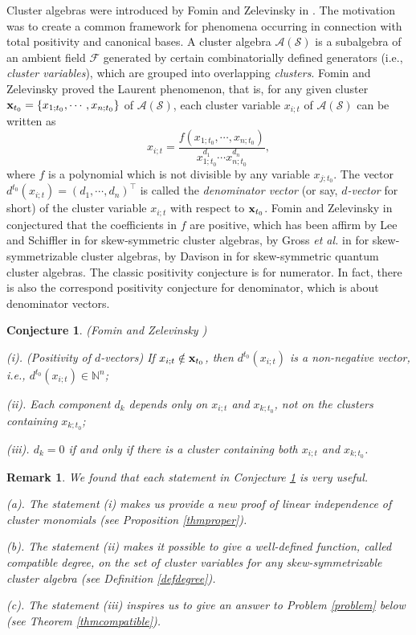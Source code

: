 \documentclass[14pt]{amsart}
\newtheorem{Remark}[Theorem]{Remark}
\newtheorem{Conjecture}[Theorem]{Conjecture}
\begin{document}
Cluster algebras were introduced by Fomin and Zelevinsky in \cite{FZ}. The motivation was to create a common framework for phenomena occurring in connection
with total positivity and canonical bases. A cluster algebra $\mathcal A(\mathcal S)$  is a subalgebra of an ambient field $\mathcal F$ generated by certain combinatorially defined generators (i.e., {\em cluster variables}), which are grouped into overlapping {\em clusters}.  Fomin and  Zelevinsky proved the Laurent phenomenon, that is,  for any given cluster ${\bf x}_{t_0}=\{x_{1;t_0},\cdots,x_{n;t_0}\}$ of $\mathcal A(\mathcal S)$, each cluster variable $x_{i;t}$ of $\mathcal A(\mathcal S)$ can be written as
 $$x_{i;t}=\frac{f(x_{1;t_0},\cdots,x_{n;t_0})}{x_{1;t_0}^{d_1}\cdots x_{n;t_0}^{d_n}},$$
where $f$ is a polynomial which is not divisible by any variable $x_{j;t_0}$. The vector $d^{t_0}(x_{i;t})=(d_1,\cdots,d_n)^{\top}$ is called  the {\em denominator vector} (or say, {\em $d$-vector} for short) of the cluster variable $x_{i;t}$ with respect to ${\bf x}_{t_0}$.  Fomin and Zelevinsky in \cite{FZ} conjectured that the coefficients in $f$ are positive, which has been affirm by Lee and Schiffler in \cite{LS} for skew-symmetric cluster algebras, by Gross {\em et al.} in \cite{GHKK} for skew-symmetrizable cluster algebras, by Davison in \cite{D} for skew-symmetric quantum cluster algebras. The classic positivity conjecture is for numerator. In fact, there is also the correspond positivity conjecture for denominator, which is about denominator vectors.




\begin{Conjecture}(Fomin and Zelevinsky \cite[Conjecture 7.4]{FZ3})\label{conjecture}


(i). (Positivity of $d$-vectors) If $x_{i;t}\notin {\bf x}_{t_0}$, then $d^{t_0}(x_{i;t})$ is a non-negative vector, i.e., $d^{t_0}(x_{i;t})\in\mathbb N^n$;

(ii). Each component $d_k$ depends only on $x_{i;t}$ and $x_{k;t_0}$, not on the clusters containing $x_{k;t_0}$;

(iii). $d_k=0$ if and only if there is a cluster containing both $x_{i;t}$ and $x_{k;t_0}$.
\end{Conjecture}

\begin{Remark}
We found that each statement in Conjecture \ref{conjecture} is very useful.

(a).  The statement (i) makes us provide a new proof of linear independence of cluster monomials (see Proposition \ref{thmproper}).

(b). The statement (ii) makes it possible to give a well-defined function, called compatible degree, on the set of cluster variables for any skew-symmetrizable cluster algebra  (see Definition \ref{defdegree}).

(c). The statement (iii) inspires us to give an answer to Problem \ref{problem} below (see Theorem \ref{thmcompatible}).
\end{Remark}
\end{document}
